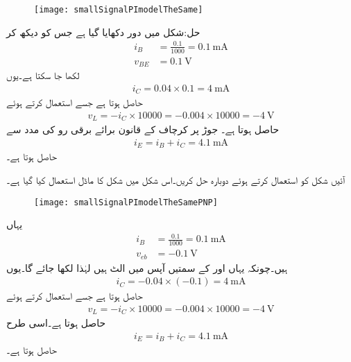 \begin{figure}
\centering
\texttt{[image: smallSignalPImodelTheSame]}
\caption{}
\label{شکل_باریک_اشاراتی_پائے_ماڈل_یکساں}
\end{figure}
حل:شکل  میں دور دکھایا گیا ہے جس کو دیکھ کر
\begin{align*}
i_B&=\frac{0.1}{1000}=\SI{0.1}{\milli \ampere}\\
v_{BE}&=\SI{0.1}{\volt}
\end{align*}
لکھا جا سکتا ہے۔یوں 
\begin{align*}
i_C=0.04 \times 0.1=\SI{4}{\milli \ampere}
\end{align*}
حاصل ہوتا ہے جسے استعمال کرتے ہوئے
\begin{align*}
v_L=-i_C \times 10000=-0.004 \times 10000=\SI{-4}{\volt}
\end{align*}
حاصل ہوتا ہے۔ جوڑ پر کرچاف کے قانون برائے برقی رو کی مدد سے 
\begin{align*}
i_E=i_B+i_C=\SI{4.1}{\milli \ampere}
\end{align*}
حاصل ہوتا ہے۔

آئیں شکل  کو استعمال کرتے ہوئے دوبارہ حل کریں۔اس شکل میں شکل  کا ماڈل استعمال کیا گیا ہے۔
\begin{figure}
\centering
\texttt{[image: smallSignalPImodelTheSamePNP]}
\caption{}
\label{شکل_باریک_اشاراتی_پائے_ماڈل_یکساں_الف}
\end{figure}
یہاں
\begin{align*}
i_B&=\frac{0.1}{1000}=\SI{0.1}{\milli \ampere}\\
v_{eb}&=\SI{-0.1}{\volt}
\end{align*}
ہیں۔چونکہ یہاں  اور  کے سمتیں آپس میں الٹ ہیں لہٰذا  لکھا جائے گا۔یوں
\begin{align*}
i_C=-0.04 \times \left(-0.1 \right)=\SI{4}{\milli \ampere}
\end{align*}
حاصل ہوتا ہے جسے استعمال کرتے ہوئے
\begin{align*}
v_L=-i_C \times 10000=-0.004 \times 10000=\SI{-4}{\volt}
\end{align*}
حاصل ہوتا ہے۔اسی طرح
\begin{align*}
i_E=i_B+i_C=\SI{4.1}{\milli \ampere}
\end{align*}
حاصل ہوتا ہے۔


